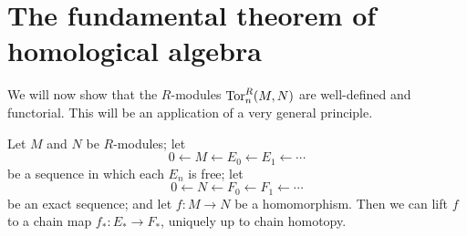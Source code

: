 \section{The fundamental theorem of homological algebra}

We will now show that the $R$-modules $\operatorname{Tor}^R_n(M,N)$ are well-defined 
and functorial. This will be an application of a very general principle.
\begin{theorem}
\label{thm-ftha}
Let $M$ and $N$ be $R$-modules; let
\[
0\leftarrow M\leftarrow E_0\leftarrow E_1\leftarrow\cdots
\]
be a sequence in which each $E_n$ is free; let
\[
0\leftarrow N\leftarrow F_0\leftarrow F_1\leftarrow\cdots
\]
be an exact sequence; and let $f:M\to N$ be a homomorphism.
Then we can lift $f$ to a chain map $f_*:E_*\to F_*$, uniquely up to chain
homotopy.
\end{theorem}
